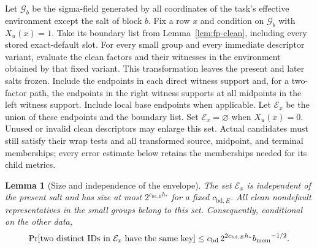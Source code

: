 \documentclass[11pt]{article}
\numberwithin{equation}{section}
\newtheorem{lemma}[theorem]{Lemma}
\theoremstyle{definition}
\theoremstyle{remark}
\begin{document}
Let $\mathcal G_b$ be the sigma-field generated by all coordinates of the
task's effective environment except the salt of block $b$.  Fix a row
$x$ and condition on $\mathcal G_b$ with $X_u(x)=1$.  Take its boundary list from
Lemma~\ref{lem:fp-clean}, including every stored exact-default slot.
For every small group and every immediate
descriptor variant, evaluate the clean factors and their witnesses in
the environment obtained by that fixed variant.  This transformation
leaves the present and later salts frozen.  Include the endpoints in
each direct witness support and, for a two-factor path, the endpoints
in the right witness supports at all midpoints in the left witness
support.  Include local base endpoints when applicable.  Let
$\mathcal E_x$ be the union of these endpoints and the boundary list.
Set $\mathcal E_x=\varnothing$ when $X_u(x)=0$.
Unused or invalid clean descriptors may enlarge this set.  Actual
candidates must still satisfy their wrap tests and all transformed
source, midpoint, and terminal memberships; every error estimate below
retains the memberships needed for its child metrics.

\begin{lemma}[Size and independence of the envelope]
\label{lem:fp-envelope}
The set $\mathcal E_x$ is independent of the present salt and has size at
most $2^{{c_{\mathrm{bd},E}}h_*}$ for a fixed ${c_{\mathrm{bd},E}}$.  All clean nondefault representatives
in the small groups belong to this set.  Consequently, conditional on
the other data,
\begin{equation}
 \Pr[\text{two distinct IDs in $\mathcal E_x$ have the same key}]
 \le {c_{\rm bd}}\,2^{2{c_{\mathrm{bd},E}}h_*}{b_{\rm mem}}^{-1/2}.
 \label{eq:fp-envelope-collision}
\end{equation}
\end{lemma}
\end{document}
